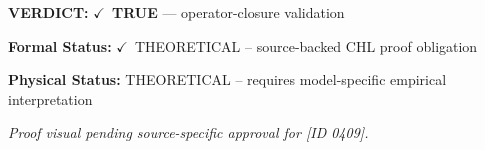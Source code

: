 \textbf{VERDICT:} \ensuremath{\checkmark}\ \textbf{TRUE} --- operator-closure validation

\textbf{Formal Status:} \ensuremath{\checkmark}\ THEORETICAL -- source-backed CHL proof obligation

\textbf{Physical Status:} THEORETICAL -- requires model-specific empirical interpretation
\par\vspace{0.45em}
\par
\vfill
\begingroup\footnotesize\itshape
Proof visual pending source-specific approval for [ID 0409].
\par\endgroup
\vfill
\endgroup
\endgroup

